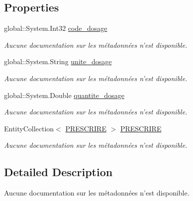 \subsection*{Properties}
\begin{DoxyCompactItemize}
\item 
global\-::\-System.\-Int32 \hyperlink{class_model_1_1_d_o_s_a_g_e_af32ad785d5d3cdf43390c6a6f02d078a}{code\-\_\-dosage}
\begin{DoxyCompactList}\small\item\em Aucune documentation sur les métadonnées n'est disponible. \end{DoxyCompactList}\item 
global\-::\-System.\-String \hyperlink{class_model_1_1_d_o_s_a_g_e_a3404cd2f5d068ae264fd6848e4baf4e5}{unite\-\_\-dosage}
\begin{DoxyCompactList}\small\item\em Aucune documentation sur les métadonnées n'est disponible. \end{DoxyCompactList}\item 
global\-::\-System.\-Double \hyperlink{class_model_1_1_d_o_s_a_g_e_ac3bf6f580f1ebe8e492def33d2b8bcbc}{quantite\-\_\-dosage}
\begin{DoxyCompactList}\small\item\em Aucune documentation sur les métadonnées n'est disponible. \end{DoxyCompactList}\item 
Entity\-Collection$<$ \hyperlink{class_model_1_1_p_r_e_s_c_r_i_r_e}{P\-R\-E\-S\-C\-R\-I\-R\-E} $>$ \hyperlink{class_model_1_1_d_o_s_a_g_e_a98f3391689994e603d1b4e97b3e29f61}{P\-R\-E\-S\-C\-R\-I\-R\-E}
\begin{DoxyCompactList}\small\item\em Aucune documentation sur les métadonnées n'est disponible. \end{DoxyCompactList}\end{DoxyCompactItemize}


\subsection{Detailed Description}
Aucune documentation sur les métadonnées n'est disponible. 



